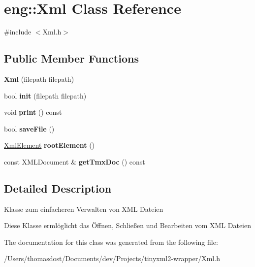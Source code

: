 \hypertarget{classeng_1_1_xml}{}\section{eng\+:\+:Xml Class Reference}
\label{classeng_1_1_xml}


{\ttfamily \#include $<$Xml.\+h$>$}

\subsection*{Public Member Functions}
\begin{DoxyCompactItemize}
\item 
\mbox{\label{classeng_1_1_xml_abc3374e37afa320f54d5ed1a02a3ba32}} 
{\bfseries Xml} (filepath filepath)
\item 
\mbox{\label{classeng_1_1_xml_ad7360970bae09b39a733b9a8dcdc2ef3}} 
bool {\bfseries init} (filepath filepath)
\item 
\mbox{\label{classeng_1_1_xml_a2906a7cf0f42524ba941570fb33aa6e4}} 
void {\bfseries print} () const
\item 
\mbox{\label{classeng_1_1_xml_a6a3612af5bf49ffb9f92e59e0a47d161}} 
bool {\bfseries save\+File} ()
\item 
\mbox{\label{classeng_1_1_xml_ac9105eed50dcf5580ba9466b02309604}} 
\hyperlink{classeng_1_1_xml_element}{Xml\+Element} {\bfseries root\+Element} ()
\item 
\mbox{\label{classeng_1_1_xml_a097d020188ded17929f6007678e2b6be}} 
const X\+M\+L\+Document \& {\bfseries get\+Tmx\+Doc} () const
\end{DoxyCompactItemize}


\subsection{Detailed Description}
Klasse zum einfacheren Verwalten von X\+ML Dateien

Diese Klasse ermlöglicht das Öffnen, Schließen und Bearbeiten vom X\+ML Dateien 

The documentation for this class was generated from the following file\+:\begin{DoxyCompactItemize}
\item 
/\+Users/thomasdost/\+Documents/dev/\+Projects/tinyxml2-\/wrapper/Xml.\+h\end{DoxyCompactItemize}
